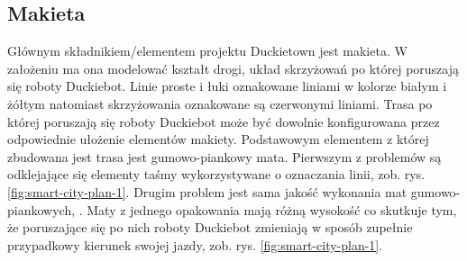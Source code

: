 \documentclass{svproc}
\begin{document}


\subsection{Makieta}\label{subsec:plane}
Głównym składnikiem/elementem projektu Duckietown jest makieta. W założeniu ma ona modelować kształt drogi, układ skrzyżowań po której poruszają się roboty Duckiebot. Linie proste i łuki oznakowane liniami w kolorze białym i żółtym natomiast skrzyżowania oznakowane są czerwonymi liniami. Trasa po której poruszają się roboty Duckiebot może być dowolnie konfigurowana przez odpowiednie ułożenie elementów makiety. Podstawowym elementem z której zbudowana jest trasa jest gumowo-piankowy mata. Pierwszym z problemów są odklejające się elementy taśmy wykorzystywane o oznaczania linii, zob. rys. \ref{fig:smart-city-plan-1}. Drugim problem jest sama jakość wykonania mat gumowo-piankowych, . Maty z jednego opakowania mają różną wysokość co skutkuje tym, że poruszające się po nich roboty Duckiebot zmieniają w sposób zupełnie przypadkowy kierunek swojej jazdy, zob. rys. \ref{fig:smart-city-plan-1}.
\end{document}
